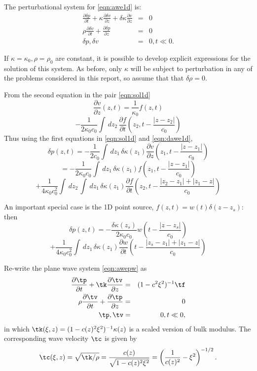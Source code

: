 
The perturbational system for \ref{eqn:awe1d} is:
\begin{eqnarray}
\label{eqn:dawe1d}
\frac{\partial \delta p}{\partial t} +\kappa\frac{\partial
  \delta v}{\partial z} + \delta \kappa\frac{\partial
  v}{\partial z} &=& 0 \nonumber\\
\rho \frac{\partial \delta v}{\partial t} + \frac{\partial \delta p}{\partial
  z}&=&0\nonumber\\
\delta p,\delta v&=&0, t \ll 0.
\end{eqnarray}

If $\kappa=\kappa_0, \rho=\rho_0 $ are constant, it is possible to develop explicit
expressions for the solution of this system. As before, only $\kappa$ will be
subject to perturbation in any of the problems considered in this
report, so assume that that $\delta\rho=0$.

From the second equation in the pair \ref{eqn:sol1d}
\[
  \frac{\partial v}{\partial z}(z,t) = \frac{1}{\kappa_0} f(z,t) 
\]
\begin{equation}
  \label{eqn:sol1ddvdz}
 - \frac{1}{2\kappa_0c_0} \int\, dz_2\, \frac{\partial f}{\partial t}\left(z_2,t - \frac{|z-z_2|}{c_0}\right)
\end{equation}
Thus using the first equations in \ref{eqn:sol1d} and \ref{eqn:dawe1d}, 
\[
  \delta p(z,t) =- \frac{1}{2c_0} \int \, dz_1 \, \delta
  \kappa(z_1)\frac{\partial v}{\partial z}\left(z_1,t - \frac{|z-z_1|}{c_0}\right)
\]
\[
  =-\frac{1}{2\kappa_0c_0} \int \,dz_1\, \delta
  \kappa(z_1) f \left(z_1,t - \frac{|z-z_1|}{c_0}\right)
  \]
\begin{equation}
  \label{eqn:sol1ddp}
  + \frac{1}{4\kappa_0c_0^2} \int\,dz_2 \, \int \,dz_1\,\delta 
  \kappa(z_1) \frac{\partial f}{\partial t}\left(z_2,t - \frac{|z_2-z_1|+|z_1-z|}{c_0}\right)
\end{equation}

An important special case is the 1D point source,
$f(z,t)=w(t)\delta(z-z_s)$: then
\[
  \delta p(z,t) = -\frac{\delta \kappa(z_s)}{2\kappa_0c_0}w\left(t - \frac{|z-z_s|}{c_0}\right)
\]
\begin{equation}
  \label{eqn:sol1ddppw}
  +\frac{1}{4\kappa_0c_0^2} \int \,dz_1\,\delta 
  \kappa(z_1) \frac{\partial w}{\partial t}\left(t - \frac{|z_s-z_1|+|z_1-z|}{c_0}\right)
\end{equation}


Re-write the plane wave system \ref{eqn:awepw} as
\begin{eqnarray}
\label{eqn:awepw1}
\frac{\partial \tp}{\partial t} + \tk\frac{\partial
  \tv}{\partial z} &=& (1-c^2\xi^2)^{-1}\tf \nonumber\\
\rho \frac{\partial \tv}{\partial t} + \frac{\partial \tp}{\partial
  z}&=&0\nonumber\\
\tp,\tv&=&0, t \ll 0,
\end{eqnarray}
in which $\tk(\xi,z)=(1-c(z)^2\xi^2)^{-1}\kappa(z)$ is a scaled version of
bulk modulus. The corresponding wave velocity $\tc$ is given by
\[
\tc(\xi,z)=\sqrt{\tk/\rho} = \frac{c(z)}{\sqrt{1-c(z)^2\xi^2}} =
\left(\frac{1}{c(z)^2}-\xi^2\right)^{-1/2}.
\]

